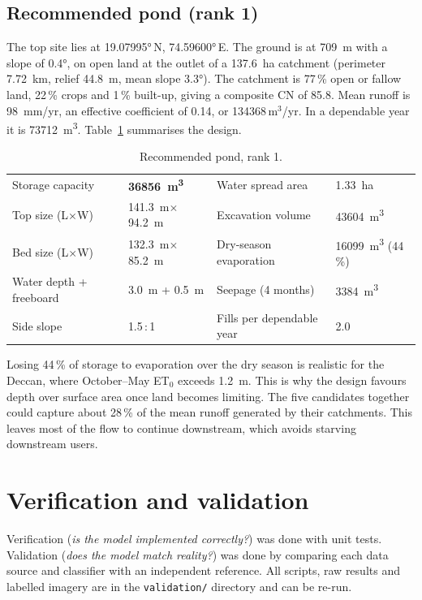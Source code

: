 \documentclass[11pt,a4paper]{article}
\newcommand{\code}[1]{\texttt{\small #1}}
\begin{document}
\subsection{Recommended pond (rank 1)}
The top site lies at \ang{19.07995}\,N, \ang{74.59600}\,E. The ground is at \SI{709}{m} with a
slope of \ang{0.4}, on open land at the outlet of a \SI{137.6}{ha} catchment (perimeter
\SI{7.72}{km}, relief \SI{44.8}{m}, mean slope \ang{3.3}). The catchment is 77\,\% open or
fallow land, 22\,\% crops and 1\,\% built-up, giving a composite CN of 85.8. Mean runoff is
\SI{98}{mm/yr}, an effective coefficient of 0.14, or \num{134368}\,m$^3$/yr. In a
dependable year it is \SI{73712}{\cubic\metre}. Table~\ref{tab:design} summarises the design.

\begin{table}[H]
\centering\small
\caption{Recommended pond, rank 1.}
\label{tab:design}
\begin{tabular}{@{}ll@{\hspace{2.5em}}ll@{}}
\toprule
Storage capacity & \textbf{\SI{36856}{\cubic\metre}} & Water spread area & \SI{1.33}{ha}\\
Top size (L$\times$W) & \SI{141.3}{m}$\times$\SI{94.2}{m} & Excavation volume & \SI{43604}{\cubic\metre}\\
Bed size (L$\times$W) & \SI{132.3}{m}$\times$\SI{85.2}{m} & Dry-season evaporation & \SI{16099}{\cubic\metre} (44\,\%)\\
Water depth + freeboard & \SI{3.0}{m} + \SI{0.5}{m} & Seepage (4 months) & \SI{3384}{\cubic\metre}\\
Side slope & 1.5\,:\,1 & Fills per dependable year & 2.0\\
\bottomrule
\end{tabular}
\end{table}

\begin{keybox}[Interpretation]
Losing 44\,\% of storage to evaporation over the dry season is realistic for the Deccan, where
October--May ET$_0$ exceeds \SI{1.2}{m}. This is why the design favours depth over surface
area once land becomes limiting. The five candidates together could capture about 28\,\% of
the mean runoff generated by their catchments. This leaves most of the flow to continue
downstream, which avoids starving downstream users.
\end{keybox}

\section{Verification and validation}\label{sec:validation}
Verification (\emph{is the model implemented correctly?}) was done with unit tests.
Validation (\emph{does the model match reality?}) was done by comparing each data source and
classifier with an independent reference. All scripts, raw results and labelled imagery are in
the \code{validation/} directory and can be re-run.
\end{document}
